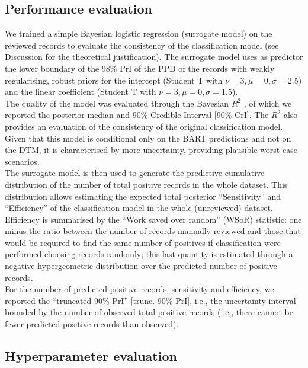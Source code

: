 \documentclass[]{bmcart}
\begin{document}
\subsection*{Performance evaluation}

We trained a simple Bayesian logistic regression (surrogate model) on
the reviewed records to evaluate the consistency of the classification
model (see Discussion for the theoretical justification). The surrogate
model uses as predictor the lower boundary of the 98\% PrI of the PPD of
the records with weakly regularising, robust priors for the intercept
(Student T with \(\nu=3,\mu=0,\sigma=2.5\)) and the linear coefficient
(Student T with \(\nu=3,\mu=0,\sigma=1.5\)).\\
The quality of the model was evaluated through the Bayesian \(R^2\)
\citep{gelman2019r}, of which we reported the posterior median and 90\%
Credible Interval {[}90\% CrI{]}. The \(R^2\) also provides an
evaluation of the consistency of the original classification model.
Given that this model is conditional only on the BART predictions and
not on the DTM, it is characterised by more uncertainty, providing
plausible worst-case scenarios.\\
The surrogate model is then used to generate the predictive cumulative
distribution of the number of total positive records in the whole
dataset. This distribution allows estimating the expected total
posterior ``Sensitivity'' and ``Efficiency'' of the classification model
in the whole (unreviewed) dataset. Efficiency is summarised by the
``Work saved over random'' (WSoR) statistic: one minus the ratio between
the number of records manually reviewed and those that would be required
to find the same number of positives if classification were performed
choosing records randomly; this last quantity is estimated through a
negative hypergeometric distribution \citep{chae1993presenting} over the
predicted number of positive records.\\
For the number of predicted positive records, sensitivity and
efficiency, we reported the ``truncated 90\% PrI'' {[}trunc. 90\%
PrI{]}, i.e., the uncertainty interval bounded by the number of observed
total positive records (i.e., there cannot be fewer predicted positive
records than observed).

\subsection*{Hyperparameter evaluation}
\end{document}
